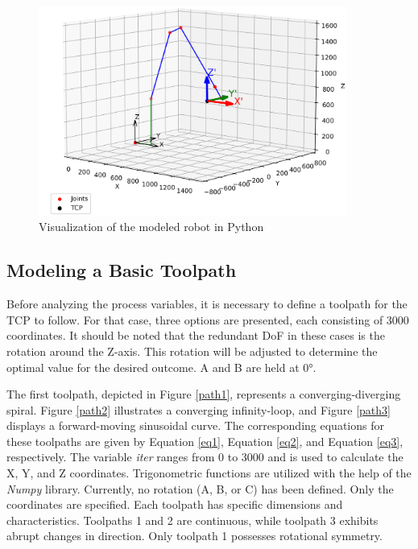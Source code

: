 \newpage

 \begin{figure}[H]
	\centerline{\includegraphics[width=0.9\textwidth]{figures/robotprog.png}}
	\caption{Visualization of the modeled robot in Python}
	\label{robotprog}
\end{figure}


\subsection{Modeling a Basic Toolpath}\label{MBT}
Before analyzing the process variables, it is necessary to define a toolpath for the \acrshort{TCP} to follow. For that case, three options are presented, each consisting of 3000 coordinates. It should be noted that the redundant \acrshort{DoF} in these cases is the rotation around the Z-axis. This rotation will be adjusted to determine the optimal value for the desired outcome. A and B are held at 0°.

The first toolpath, depicted in Figure \ref{path1}, represents a converging-diverging spiral. Figure \ref{path2} illustrates a converging infinity-loop, and Figure \ref{path3} displays a forward-moving sinusoidal curve. The corresponding equations for these toolpaths are given by Equation \ref{eq1}, Equation \ref{eq2}, and Equation \ref{eq3}, respectively. The variable \textit{iter} ranges from 0 to 3000 and is used to calculate the X, Y, and Z coordinates. Trigonometric functions are utilized with the help of the \textit{Numpy} library. Currently, no rotation (A, B, or C) has been defined. Only the coordinates are specified. Each toolpath has specific dimensions and characteristics. Toolpaths 1 and 2 are continuous, while toolpath 3 exhibits abrupt changes in direction. Only toolpath 1 possesses rotational symmetry.\newpage


